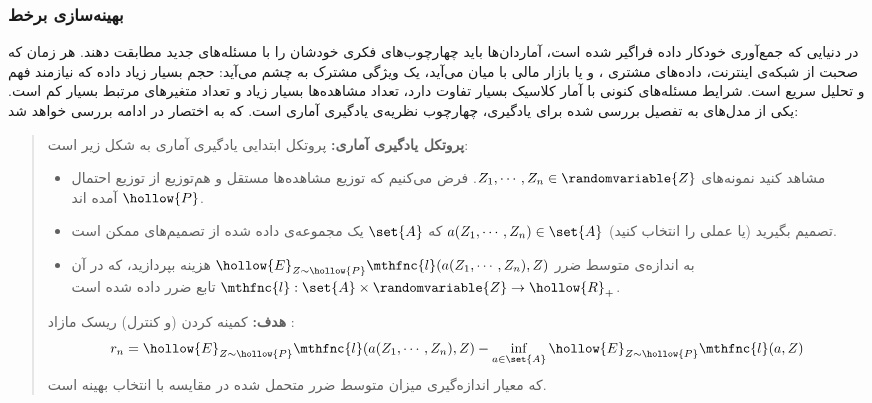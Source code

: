 
\subsubsection{
بهینه‌سازی برخط
\cite{onlinelearningbubeck}
}


در دنیایی که جمع‌آوری خودکار داده فراگیر شده است، آماردان‌ها باید چهارچوب‌های فکری خودشان را با مسئله‌های جدید مطابقت دهند. هر زمان که صحبت از شبکه‌ی اینترنت، داده‌های مشتری
، و یا بازار مالی
 با میان می‌آید، یک ویژگی مشترک به چشم می‌آید: حجم بسیار زیاد داده که نیازمند فهم و تحلیل سریع است. شرایط مسئله‌های کنونی با آمار کلاسیک بسیار تفاوت دارد، تعداد مشاهده‌ها بسیار زیاد و تعداد متغیرهای مرتبط بسیار کم است. یکی از مدل‌های به تفصیل بررسی شده برای یادگیری، چهارچوب نظریه‌ی یادگیری آماری است. که به اختصار در ادامه بررسی خواهد شد:

\begin{quote}
{\bf
پروتکل
 یادگیری آماری:
} 
پروتکل ابتدایی یادگیری آماری به شکل زیر است:
\begin{itemize}
\item
مشاهد کنید نمونه‌های 
$Z_1, \cdots, Z_n \in \randomvariable{Z}$. 
فرض می‌کنیم که توزیع مشاهده‌ها مستقل و هم‌توزیع
 از توزیع احتمال 
$\hollow{P}$
آمده اند.

\item
تصمیم بگیرید (یا عملی را انتخاب کنید) 
$a( Z_1, \cdots, Z_n ) \in \set{A}$ 
که 
$\set{A}$ 
یک مجموعه‌ی داده شده از تصمیم‌های ممکن است.

\item
به اندازه‌ی متوسط ضرر
$\hollow{E}_{Z \sim \hollow{P}} \mthfnc{l}( a(Z_1,\cdots,Z_n), Z )$ 
هزینه بپردازید، که در آن 
$\mthfnc{l} : \set{A} \times \randomvariable{Z} \rightarrow \hollow{R}_+$ 
تابع ضرر داده شده است.
\end{itemize}

{\bf
هدف:
} 
کمینه کردن (و کنترل) ریسک مازاد
:
\[
r_n = \hollow{E}_{Z \sim \hollow{P}} \mthfnc{l}( a(Z_1, \cdots, Z_n), Z ) - \inf_{a \in \set{A}} \hollow{E}_{Z \sim \hollow{P}} \mthfnc{l} ( a, Z )
\]
که معیار اندازه‌گیری میزان متوسط ضرر متحمل شده در مقایسه با انتخاب بهینه است.

\end{quote}



